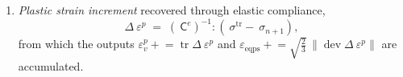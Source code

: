 \documentclass[12pt]{article}
\DeclareMathOperator{\trace}{tr}
\DeclareMathOperator{\dev}{dev}
\newcommand{\stress}{~\sigma}
\newcommand{\pstrain}{{~\varepsilon^p}}
\newcommand{\Celast}{{~{\mathsf C}^e}}
\begin{document}
\begin{enumerate}
\begin{enumerate}
\begin{equation}
{                            \epsilon)} .
            \end{equation}
      \item If $\eta > \texttt{Substep Tolerance}$ and
            $\Delta T > \Delta T_{\min}$: reject, set
            $\Delta T \leftarrow
            \max\bigl(0.9\sqrt{\mathrm{STOL}/\eta},\,0.1\bigr)\,\Delta T$
            (floored at $\Delta T_{\min}$), retry.
      \item Otherwise accept: apply the drift correction below,
            advance $T \leftarrow T + \Delta T$, and grow
            $\Delta T \leftarrow
            \min\bigl(0.9\sqrt{\mathrm{STOL}/\eta},\,1.1\bigr)\,\Delta T$,
            capped at $1 - T$.
      \end{enumerate}
\item \emph{Plastic strain increment} recovered through elastic
      compliance,
      \begin{equation}
        \Delta\pstrain \;=\; (\Celast)^{-1} : (\stress^{\mathrm{tr}}
                                              - \stress_{n+1}),
      \end{equation}
      from which the outputs
      $\varepsilon_v^p \mathrel{+}= \trace\Delta\pstrain$ and
      $\varepsilon_{\mathrm{eqps}} \mathrel{+}=
      \sqrt{\tfrac{2}{3}}\,\|\dev\Delta\pstrain\|$ are accumulated.
\end{enumerate}
\end{document}
